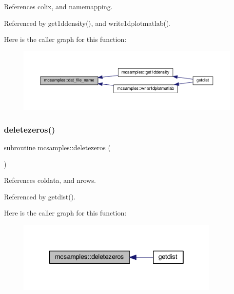References colix, and namemapping.



Referenced by get1ddensity(), and write1dplotmatlab().

Here is the caller graph for this function\+:
\nopagebreak
\begin{figure}[H]
\begin{center}
\leavevmode
\includegraphics[width=350pt]{namespacemcsamples_a8613f88e39f47c058447963d5b9f53dc_icgraph}
\end{center}
\end{figure}
\mbox{\label{namespacemcsamples_a35bad035408957649f1a00bc87bc798c}} 
\subsubsection{\texorpdfstring{deletezeros()}{deletezeros()}}
{\footnotesize\ttfamily subroutine mcsamples\+::deletezeros (\begin{DoxyParamCaption}{ }\end{DoxyParamCaption})}



References coldata, and nrows.



Referenced by getdist().

Here is the caller graph for this function\+:
\nopagebreak
\begin{figure}[H]
\begin{center}
\leavevmode
\includegraphics[width=286pt]{namespacemcsamples_a35bad035408957649f1a00bc87bc798c_icgraph}
\end{center}
\end{figure}
\mbox{\label{namespacemcsamples_af7511fd6eb58bcc6086256f9ecb5fe1c}} 
